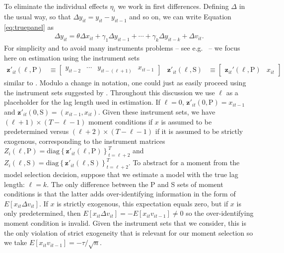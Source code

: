 To eliminate the individual effects $\eta_i$ we work in first differences.
Defining $\Delta$ in the usual way, so that $\Delta y_{it} = y_{it} - y_{it-1}$ and so on, we can write Equation \ref{eq:truepanel} as
\begin{align}
  \Delta y_{it} = \theta \Delta x_{it} + \gamma_1 \Delta y_{it-1} + \cdots + \gamma_k \Delta y_{it-k}  + \Delta v_{it}.
  \label{eq:truepaneldiff}
\end{align}
For simplicity and to avoid many instruments problems -- see e.g.\ \cite{Roodman} -- we focus here on estimation using the instrument sets
\begin{align}
  \mathbf{z}'_{it}(\ell, \text{P}) &\equiv \left[
  \begin{array}{cccc}
    y_{it-2} & \cdots & y_{it-(\ell + 1)} & x_{it-1}
  \end{array}
\right] & 
\mathbf{z}'_{it}(\ell,\text{S}) &\equiv \left[
\begin{array}{cc}
  \mathbf{z}_{it}'(\ell,\text{P}) & x_{it}
\end{array}
\right]
\label{eq:Zdpanel}
\end{align}
similar to \cite{AndersonHsiao}.
Modulo a change in notation, one could just as easily proceed using the instrument sets suggested by \cite{ArellanoBond}.
Throughout this discussion we use $\ell$ as a placeholder for the lag length used in estimation.
If $\ell = 0$, $\mathbf{z}'_{it}(0,\text{P}) = x_{it-1}$ and $\mathbf{z}'_{it}(0,\text{S}) = (x_{it-1}, x_{it})$.
Given these instrument sets, we have $(\ell + 1)\times (T -\ell - 1)$ moment conditions if $x$ is assumed to be predetermined versus $(\ell + 2)\times (T - \ell - 1)$ if it is assumed to be strictly exogenous, corresponding to the instrument matrices
  $Z_i(\ell,\text{P}) = \mbox{diag}\left\{ \mathbf{z}'_{it}(\ell,\text{P})  \right\}_{t = \ell + 2}^T$ and  $Z_i(\ell,\text{S}) = \mbox{diag}\left\{\mathbf{z}'_{it}(\ell,\text{S}) \right\}_{t = \ell +2}^T$.
To abstract for a moment from the model selection decision, suppose that we estimate a model with the true lag length: $\ell = k$.
The only difference between the P and S sets of moment conditions is that the latter adds over-identifying information in the form of $E[x_{it}\Delta v_{it}]$.
If $x$ is strictly exogenous, this expectation equals zero, but if $x$ is only predetermined, then $E[x_{it}\Delta v_{it}] = -E[x_{it}v_{it-1}] \neq 0$ so the over-identifying moment condition is invalid.
Given the instrument sets that we consider, this is the only violation of strict exogeneity that is relevant for our moment selection so we take $E[x_{it}v_{it-1}] = -\tau/\sqrt{n}$.

